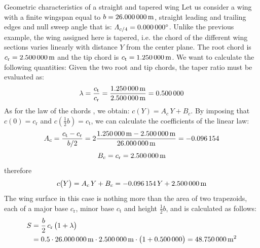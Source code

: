 \documentclass[[12pt,twoside]{book}
\begin{document}
\begin{myExampleX}{Geometric characteristics of a straight and tapered wing}{}%
\label{example:Geometric:Characteristics:Of:A:Straight:And:Tapered:Wing}
%
\noindent
Let us consider a wing with a finite wingspan equal to $b=\SI[round-precision=1]{\mySpanWingMT}{\metre}$,
straight leading and trailing edges and null sweep angle that is: $\Lambda_{c/4}=\SI[round-precision=0]{\myLambdaCQuarterDeg}{\degree}$.
Unlike the previous example, the wing assigned here is tapered, i.e.
the chord of the different wing sections varies linearly with distance $Y$ from the center plane. The root chord is
$c_\mathrm{r}=\SI[round-precision=2]{\myChordRootWingMT}{\metre}$ and the tip chord is $c_\mathrm{t}=\SI[round-precision=2]{\myChordTipWingMT}{\metre}$.
We want to calculate the following quantities:
\medskip
Given the two root and tip chords, the taper ratio must be evaluated as:
\[
\lambda
  =\frac{c_\mathrm{t}}{c_\mathrm{r}}
  =\frac{\SI[round-precision=2]{\myChordTipWingMT}{\metre}}{\SI[round-precision=2]{\myChordRootWingMT}{\metre}}
  = \SI[round-precision=2]{\myTaperRatioWing}{} 
\]
As for the law of the chords , we obtain:
$c ( Y ) = A_c \, Y + B_c$. By imposing that $c(0)=c_\mathrm{r}$ and $c(\frac{1}{2}b)=c_\mathrm{t}$,
we can calculate the coefficients of the linear law:
\[
A_c
  = \frac{c_\mathrm{t} - c_\mathrm{r}}{b/2}
  = 
    2 \frac{
      \SI[round-precision=2]{\myChordTipWingMT}{\metre} - \SI[round-precision=2]{\myChordRootWingMT}{\metre}
    }{
      \SI[round-precision=2]{\mySpanWingMT}{\metre}
    }
  =  \SI[round-precision=3]{\myCoefficientA}{} 
\]
\[
B_c
  = c_\mathrm{r}
  =  \SI[round-precision=2]{\myCoefficientB}{\metre} 
\]
therefore
\[
c \big( Y \big) = A_c \, Y + B_c
  = \SI[round-precision=3]{\myCoefficientA}{} \, Y
    + \SI[round-precision=2]{\myCoefficientB}{\metre}
\]
The wing surface in this case is nothing more than the area of two trapezoids,
each of a major base $c_\mathrm{r}$, minor base $c_\mathrm{t}$ and height $\frac{1}{2}b$, and is calculated as follows:
\[
\begin{split}
S & {}= \frac{b}{2} \, c_\mathrm{r} \, \big( 1 + \lambda \big) \\
  & {}=
    \num{0.5} \cdot \SI[round-precision=1]{\mySpanWingMT}{\metre}
      \cdot \SI[round-precision=2]{\myChordRootWingMT}{\metre}
      \cdot \big( 1 + \SI[round-precision=2]{\myTaperRatioWing}{} \big) 
    =  \SI[round-precision=1]{\myAreaWingMTsquared}{\metre^2} 

\end{split}\]
\end{myExampleX}
\end{document}

